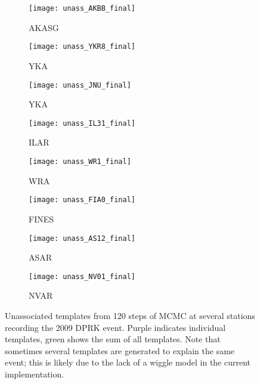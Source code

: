 \documentclass{article}
\begin{document}
\begin{figure}
        \centering 
        \begin{subfigure}[b]{0.3\textwidth}
                \centering   
                \texttt{[image: unass\_AKBB\_final]}
                \caption{AKASG}
        \end{subfigure}%
        \begin{subfigure}[b]{0.3\textwidth}
                \centering   
                \texttt{[image: unass\_YKR8\_final]}
                \caption{YKA}
        \end{subfigure}%
        \begin{subfigure}[b]{0.3\textwidth}
                \centering   
                \texttt{[image: unass\_JNU\_final]}
                \caption{YKA}
        \end{subfigure}%

        \begin{subfigure}[b]{0.3\textwidth}
                \centering   
                \texttt{[image: unass\_IL31\_final]}
                \caption{ILAR}
        \end{subfigure}%
        \begin{subfigure}[b]{0.3\textwidth}
                \centering   
                \texttt{[image: unass\_WR1\_final]}
                \caption{WRA}
        \end{subfigure}%
        \begin{subfigure}[b]{0.3\textwidth}
                \centering   
                \texttt{[image: unass\_FIA0\_final]}
                \caption{FINES}
        \end{subfigure}%

        \begin{subfigure}[b]{0.3\textwidth}
                \centering   
                \texttt{[image: unass\_AS12\_final]}
                \caption{ASAR}
        \end{subfigure}%
        \begin{subfigure}[b]{0.3\textwidth}
                \centering   
                \texttt{[image: unass\_NV01\_final]}
                \caption{NVAR}
        \end{subfigure}%
        \caption{Unassociated templates from 120 steps of MCMC at several stations recording the 2009 DPRK event. Purple indicates individual templates, green shows the sum of all templates. Note that sometimes several templates are generated to explain the same event; this is likely due to the lack of a wiggle model in the current implementation.}\label{fig:templates}
\end{figure}
\end{document}
